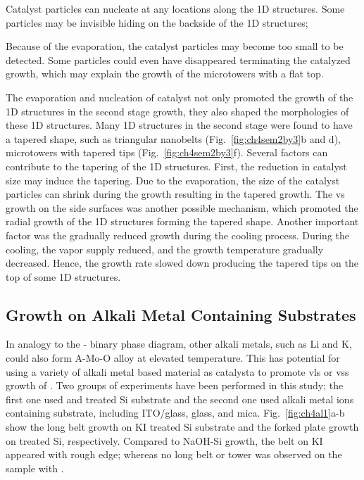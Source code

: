 \begin{enumerate*}[label=\itshape\alph*\upshape)]
\item Catalyst particles can nucleate at any locations along the 1D structures. Some particles may be invisible hiding on the backside of the 1D structures;
\item Because of the evaporation, the catalyst particles may become too small to be detected. Some particles could even have disappeared terminating the catalyzed growth, which may explain the growth of the microtowers with a flat top.
\end{enumerate*} The evaporation and nucleation of catalyst not only promoted the growth of the 1D structures in the second stage growth, they also shaped the morphologies of these 1D structures. Many 1D structures in the second stage were found to have a tapered shape, such as triangular nanobelts (Fig.~\ref{fig:ch4sem2by3}b and d), microtowers with tapered tips (Fig.~\ref{fig:ch4sem2by3}f). Several factors can contribute to the tapering of the 1D structures. First, the reduction in catalyst size may induce the tapering. Due to the evaporation, the size of the catalyst particles can shrink during the growth resulting in the tapered growth. The \gls{vs} growth on the side surfaces was another possible mechanism, which promoted the radial growth of the 1D structures forming the tapered shape. Another important factor was the gradually reduced growth during the cooling process. During the cooling, the  vapor supply reduced, and the growth temperature gradually decreased. Hence, the growth rate slowed down producing the tapered tips on the top of some 1D structures.

\subsection{Growth on Alkali Metal Containing Substrates}\label{sec:glass}
In analogy to the - binary phase diagram, other alkali metals, such as Li and K, could also form A-Mo-O alloy at elevated temperature. This has potential for using a variety of alkali metal based material as catalysta to promote \gls{vls} or \gls{vss} growth of . Two groups of experiments have been performed in this study; the first one used  and  treated Si substrate and the second one used alkali metal ions containing substrate, including ITO/glass, glass, and mica. Fig.~\ref{fig:ch4al1}a-b show the long belt growth on KI treated Si substrate and the forked plate growth on  treated Si, respectively. Compared to NaOH-Si growth, the belt on KI appeared with rough edge; whereas no long belt or tower was observed on the sample with . 

